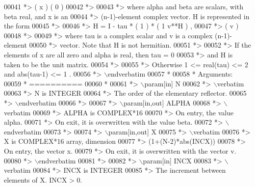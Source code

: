 \begin{DoxyCode}
00041 \textcolor{comment}{*>              (   x   )   (   0  )}
00042 \textcolor{comment}{*>}
00043 \textcolor{comment}{*> where alpha and beta are scalars, with beta real, and x is an}
00044 \textcolor{comment}{*> (n-1)-element complex vector. H is represented in the form}
00045 \textcolor{comment}{*>}
00046 \textcolor{comment}{*>       H = I - tau * ( 1 ) * ( 1 v**H ) ,}
00047 \textcolor{comment}{*>                     ( v )}
00048 \textcolor{comment}{*>}
00049 \textcolor{comment}{*> where tau is a complex scalar and v is a complex (n-1)-element}
00050 \textcolor{comment}{*> vector. Note that H is not hermitian.}
00051 \textcolor{comment}{*>}
00052 \textcolor{comment}{*> If the elements of x are all zero and alpha is real, then tau = 0}
00053 \textcolor{comment}{*> and H is taken to be the unit matrix.}
00054 \textcolor{comment}{*>}
00055 \textcolor{comment}{*> Otherwise  1 <= real(tau) <= 2  and  abs(tau-1) <= 1 .}
00056 \textcolor{comment}{*> \(\backslash\)endverbatim}
00057 \textcolor{comment}{*}
00058 \textcolor{comment}{*  Arguments:}
00059 \textcolor{comment}{*  ==========}
00060 \textcolor{comment}{*}
00061 \textcolor{comment}{*> \(\backslash\)param[in] N}
00062 \textcolor{comment}{*> \(\backslash\)verbatim}
00063 \textcolor{comment}{*>          N is INTEGER}
00064 \textcolor{comment}{*>          The order of the elementary reflector.}
00065 \textcolor{comment}{*> \(\backslash\)endverbatim}
00066 \textcolor{comment}{*>}
00067 \textcolor{comment}{*> \(\backslash\)param[in,out] ALPHA}
00068 \textcolor{comment}{*> \(\backslash\)verbatim}
00069 \textcolor{comment}{*>          ALPHA is COMPLEX*16}
00070 \textcolor{comment}{*>          On entry, the value alpha.}
00071 \textcolor{comment}{*>          On exit, it is overwritten with the value beta.}
00072 \textcolor{comment}{*> \(\backslash\)endverbatim}
00073 \textcolor{comment}{*>}
00074 \textcolor{comment}{*> \(\backslash\)param[in,out] X}
00075 \textcolor{comment}{*> \(\backslash\)verbatim}
00076 \textcolor{comment}{*>          X is COMPLEX*16 array, dimension}
00077 \textcolor{comment}{*>                         (1+(N-2)*abs(INCX))}
00078 \textcolor{comment}{*>          On entry, the vector x.}
00079 \textcolor{comment}{*>          On exit, it is overwritten with the vector v.}
00080 \textcolor{comment}{*> \(\backslash\)endverbatim}
00081 \textcolor{comment}{*>}
00082 \textcolor{comment}{*> \(\backslash\)param[in] INCX}
00083 \textcolor{comment}{*> \(\backslash\)verbatim}
00084 \textcolor{comment}{*>          INCX is INTEGER}
00085 \textcolor{comment}{*>          The increment between elements of X. INCX > 0.}

\end{DoxyCode}
